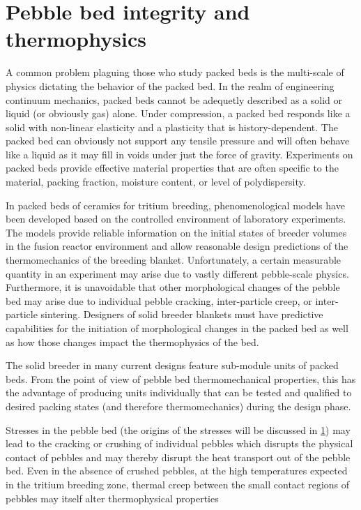 \section{Pebble bed integrity and thermophysics}\label{sec:intro-bed-integrity}

A common problem plaguing those who study packed beds is the multi-scale of physics dictating the behavior of the packed bed. In the realm of engineering continuum mechanics, packed beds cannot be adequetly described as a solid or liquid (or obviously gas) alone. Under compression, a packed bed responds like a solid with non-linear elasticity and a plasticity that is history-dependent. The packed bed can obviously not support any tensile pressure and will often behave like a liquid as it may fill in voids under just the force of gravity. Experiments on packed beds provide effective material properties that are often specific to the material, packing fraction, moisture content, or level of polydispersity.

In packed beds of ceramics for tritium breeding, phenomenological models have been developed based on the controlled environment of laboratory experiments. The models provide reliable information on the initial states of breeder volumes in the fusion reactor environment and allow reasonable design predictions of the thermomechanics of the breeding blanket. Unfortunately, a certain measurable quantity in an experiment may arise due to vastly different pebble-scale physics. Furthermore, it is unavoidable that other morphological changes of the pebble bed may arise due to individual pebble cracking, inter-particle creep, or inter-particle sintering. Designers of solid breeder blankets must have predictive capabilities for the initiation of morphological changes in the packed bed as well as how those changes impact the thermophysics of the bed.

The solid breeder in many current designs feature sub-module units of packed beds. From the point of view of pebble bed thermomechanical properties, this has the advantage of producing units individually that can be tested and qualified to desired packing states (and therefore thermomechanics) during the design phase. 








Stresses in the pebble bed (the origins of the stresses will be discussed in \cref{sec:intro-bed-integrity}) may lead to the cracking or crushing of individual pebbles which disrupts the physical contact of pebbles and may thereby disrupt the heat transport out of the pebble bed. Even in the absence of crushed pebbles, at the high temperatures expected in the tritium breeding zone, thermal creep between the small contact regions of pebbles may itself alter thermophysical properties 

